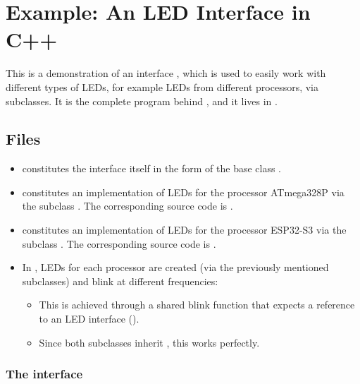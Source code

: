 
\section{Example: An LED Interface in C++}
\label{c3:sec:example}
This is a demonstration of an interface , which is used to easily
work with different types of LEDs, for example LEDs from different processors, via subclasses. It
is the complete program behind , and it lives in
.

\subsection{Files}
\label{c3:sec:examplefiles}
\begin{itemize}
  \item {} constitutes the interface itself in the form of the base
    class .
  \item {} constitutes an implementation of LEDs for the processor
    ATmega328P via the subclass . The corresponding source code is
    .
  \item {} constitutes an implementation of LEDs for the processor
    ESP32-S3 via the subclass . The corresponding source code is
    .
  \item In , LEDs for each processor are created (via the previously mentioned
    subclasses) and blink at different frequencies:
  \begin{itemize}
    \item This is achieved through a shared blink function that expects a reference to an LED
      interface ().
    \item Since both subclasses inherit , this works perfectly.
  \end{itemize}
\end{itemize}

\subsubsection{The interface}

